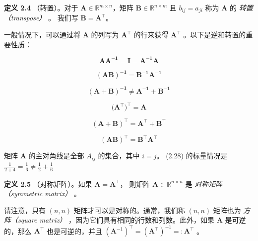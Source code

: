 \textbf{定义 2.4} （转置）。对于 $ \boldsymbol{A} \in \mathbb{R}^{m \times n} $，矩阵 $ \boldsymbol{B} \in \mathbb{R}^{n \times m} $ 且 $ b_{ij} = a_{ji} $ 称为 $ \boldsymbol{A} $ 的 \emph{转置（transpose）} 。 我们写 $ \boldsymbol{B} = \boldsymbol{A}^{\top} $。

一般情况下，可以通过将 $ \boldsymbol{A} $ 的列写为 $ \boldsymbol{A}^{\top} $ 的行来获得 $ \boldsymbol{A}^{\top} $ 。以下是逆和转置的重要性质：

\begin{equation}
\boldsymbol {AA^{-1}} = \boldsymbol{I} = \boldsymbol {A^{-1}A}
\tag{2.26}\label{eq:2-26}
\end{equation}

\begin{equation}
\boldsymbol {(AB)^{-1}} = \boldsymbol {B^{-1}A^{-1}}
\tag{2.27}\label{eq:2-27}
\end{equation}

\begin{equation}
\boldsymbol {(A + B)^{-1}} \not= \boldsymbol {A^{-1} + B^{-1}}
\tag{2.28}\label{eq:2-28}
\end{equation}

\begin{equation}
(\boldsymbol {A^{\top})^{\top}} = \boldsymbol{A}
\tag{2.29}\label{eq:2-29}
\end{equation}

\begin{equation}
\boldsymbol {(A + B)^{\top}} = \boldsymbol {A^{\top} + B^{\top}}
\tag{2.30}\label{eq:2-30}
\end{equation}

\begin{equation}
\boldsymbol {(AB)^{\top}} = \boldsymbol {B^{\top}A^{\top}}
\tag{2.31}\label{eq:2-31}
\end{equation}

\begin{notebox}
矩阵 $ \boldsymbol{A} $ 的主对角线是全部 $ A_{ij} $ 的集合，其中 $ i = j $。 (2.28) 的标量情况是 $ \frac{1}{2 + 4} = \frac{1}{6} \not= \frac{1}{2} + \frac{1}{6} $
\end{notebox}

\textbf{定义 2.5} （对称矩阵）。如果 $ \boldsymbol{A} = \boldsymbol{A}^{\top} $， 则矩阵 $ \boldsymbol{A} \in \mathbb{R}^{n \times n} $ 是 \emph{对称矩阵（symmetric matrix）} 。

请注意，只有 $ (n, n) $ 矩阵才可以是对称的。通常，我们称 $ (n, n) $ 矩阵也为 \emph{方阵（square matrix）} ，因为它们具有相同的行数和列数。此外，如果 $ \boldsymbol{A} $ 是可逆的，那么 $ \boldsymbol{A}^{\top} $ 也是可逆的，并且 $ (\boldsymbol{A}^{-1})^{\top} = (\boldsymbol{A}^{\top})^{-1} =: \boldsymbol{A}^{\top} $ 。


